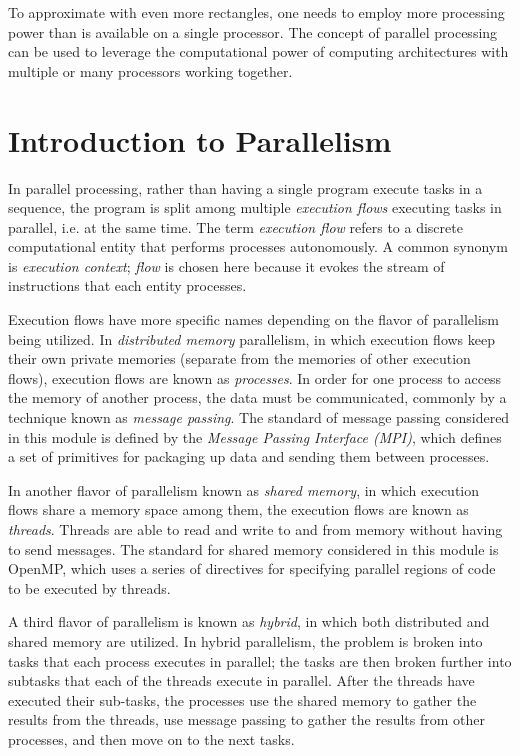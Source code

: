 \documentclass[a4paper, 11pt]{article}
\begin{document}
To approximate with even more rectangles, one needs to employ more processing power than is available on a single processor. The concept of parallel processing can be used to leverage the computational power of computing architectures with multiple or many processors working together.


\section{Introduction to Parallelism}

In parallel processing, rather than having a single program execute tasks in a sequence, the program is split among multiple \emph{execution flows} executing tasks in parallel, i.e. at the same time. The term \emph{execution flow} refers to a discrete computational entity that performs processes autonomously. A common synonym is \emph{execution context}; \emph{flow} is chosen here because it evokes the stream of instructions that each entity processes.

Execution flows have more specific names depending on the flavor of parallelism being utilized. In \emph{distributed memory} parallelism, in which execution flows keep their own private memories (separate from the memories of other execution flows), execution flows are known as \emph{processes}. In order for one process to access the memory of another process, the data must be communicated, commonly by a technique known as \emph{message passing}. The standard of message passing considered in this module is defined by the \emph{Message Passing Interface (MPI)}, which defines a set of primitives for packaging up data and sending them between processes.

In another flavor of parallelism known as \emph{shared memory}, in which execution flows share a memory space among them, the execution flows are known as \emph{threads}. Threads are able to read and write to and from memory without having to send messages. The standard for shared memory considered in this module is OpenMP, which uses a series of directives for specifying parallel regions of code to be executed by threads.

A third flavor of parallelism is known as \emph{hybrid}, in which both distributed and shared memory are utilized. In hybrid parallelism, the problem is broken into tasks that each process executes in parallel; the tasks are then broken further into subtasks that each of the threads execute in parallel. After the threads have executed their sub-tasks, the processes use the shared memory to gather the results from the threads, use message passing to gather the results from other processes, and then move on to the next tasks.
\end{document}
